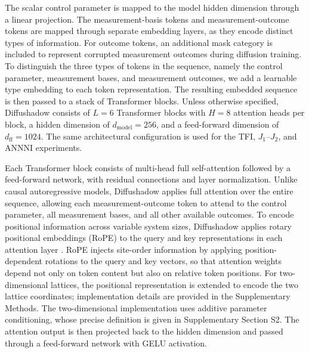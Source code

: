 \documentclass[pdflatex,sn-nature]{sn-jnl}%
\theoremstyle{thmstyleone}%
\theoremstyle{thmstyletwo}%
\theoremstyle{thmstylethree}%
\begin{document}
The scalar control parameter is mapped to the model hidden dimension through a linear projection. 
The measurement-basis tokens and measurement-outcome tokens are mapped through separate embedding layers, as they encode distinct types of information. For outcome tokens, an additional mask category is included to represent corrupted measurement outcomes during diffusion training. To distinguish the three types of tokens in the sequence, namely the control parameter, measurement bases, and measurement outcomes, we add a learnable type embedding to each token representation. The resulting embedded sequence is then passed to a stack of Transformer blocks.
Unless otherwise specified, Diffushadow consists of \(L=6\) Transformer blocks with \(H=8\) attention heads per block, a hidden dimension of \(d_{\mathrm{model}}=256\), and a feed-forward dimension of \(d_{\mathrm{ff}}=1024\). The same architectural configuration is used for the TFI, $J_1$--$J_2$, and ANNNI experiments.

Each Transformer block consists of multi-head full self-attention followed by a feed-forward network, with residual connections and layer normalization. Unlike causal autoregressive models, Diffushadow applies full attention over the entire sequence, allowing each measurement-outcome token to attend to the control parameter, all measurement bases, and all other available outcomes. 
To encode positional information across variable system sizes, Diffushadow applies rotary positional embeddings (RoPE) to the query and key representations in each attention layer \cite{su2024roformer}. RoPE injects site-order information by applying position-dependent rotations to the query and key vectors, so that attention weights depend not only on token content but also on relative token positions. For two-dimensional lattices, the positional representation is extended to encode the two lattice coordinates; implementation details are provided in the Supplementary Methods. The two-dimensional implementation uses additive parameter conditioning, whose precise definition is given in Supplementary Section S2.
The attention output is then projected back to the hidden dimension and passed through a feed-forward network with GELU activation.
\end{document}
